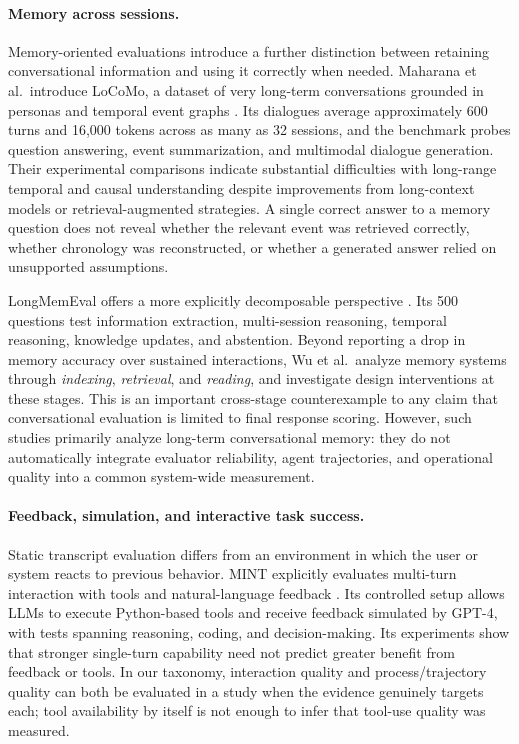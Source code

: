 \paragraph{Memory across sessions.}
Memory-oriented evaluations introduce a further distinction between retaining conversational information and using it correctly when needed. Maharana et al.\ introduce LoCoMo, a dataset of very long-term conversations grounded in personas and temporal event graphs \cite{maharana2024locomo}. Its dialogues average approximately 600 turns and 16,000 tokens across as many as 32 sessions, and the benchmark probes question answering, event summarization, and multimodal dialogue generation. Their experimental comparisons indicate substantial difficulties with long-range temporal and causal understanding despite improvements from long-context models or retrieval-augmented strategies. A single correct answer to a memory question does not reveal whether the relevant event was retrieved correctly, whether chronology was reconstructed, or whether a generated answer relied on unsupported assumptions.

LongMemEval offers a more explicitly decomposable perspective \cite{wu2025longmemeval}. Its 500 questions test information extraction, multi-session reasoning, temporal reasoning, knowledge updates, and abstention. Beyond reporting a drop in memory accuracy over sustained interactions, Wu et al.\ analyze memory systems through \emph{indexing}, \emph{retrieval}, and \emph{reading}, and investigate design interventions at these stages. This is an important cross-stage counterexample to any claim that conversational evaluation is limited to final response scoring. However, such studies primarily analyze long-term conversational memory: they do not automatically integrate evaluator reliability, agent trajectories, and operational quality into a common system-wide measurement.

\paragraph{Feedback, simulation, and interactive task success.}
Static transcript evaluation differs from an environment in which the user or system reacts to previous behavior. MINT explicitly evaluates multi-turn interaction with tools and natural-language feedback \cite{wang2024mint}. Its controlled setup allows LLMs to execute Python-based tools and receive feedback simulated by GPT-4, with tests spanning reasoning, coding, and decision-making. Its experiments show that stronger single-turn capability need not predict greater benefit from feedback or tools. In our taxonomy, interaction quality and process/trajectory quality can both be evaluated in a study when the evidence genuinely targets each; tool availability by itself is not enough to infer that tool-use quality was measured.

